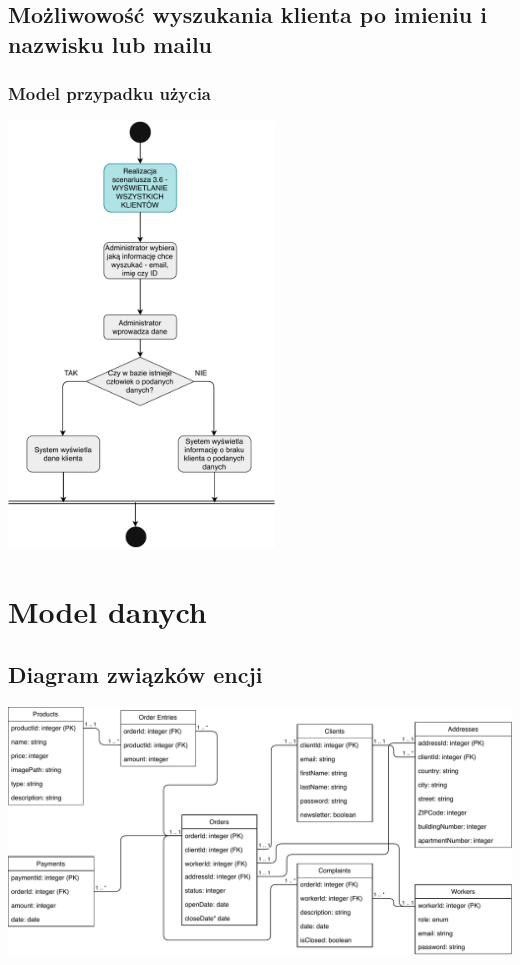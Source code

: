 \documentclass[12pt]{report}
\begin{document}
	\section{Możliwowość wyszukania klienta po imieniu i nazwisku lub mailu}
		\subsection{Model przypadku użycia}
			\begin{center}
				\includegraphics[width=200pt]{szukaj_klienta.pdf}
			\end{center}
		
	
	

	\renewcommand{\thesection}{\thechapter.\arabic{section}}		
	
\chapter{Model danych}
	
	\section{Diagram związków encji}
		\includegraphics[width=500pt]{database.pdf}
		\newpage
		
\end{document}
